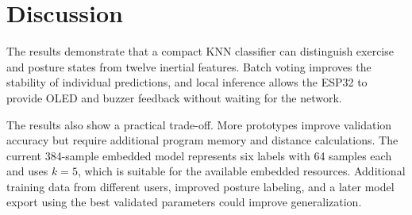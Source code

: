 \section{Discussion}
The results demonstrate that a compact KNN classifier can distinguish exercise and
posture states from twelve inertial features. Batch voting improves the stability
of individual predictions, and local inference allows the ESP32 to provide OLED
and buzzer feedback without waiting for the network.

The results also show a practical trade-off. More prototypes improve validation
accuracy but require additional program memory and distance calculations. The
current 384-sample embedded model represents six labels with 64 samples each and
uses $k=5$, which is suitable for the available embedded resources. Additional
training data from different users, improved posture labeling, and a later model
export using the best validated parameters could improve generalization.
